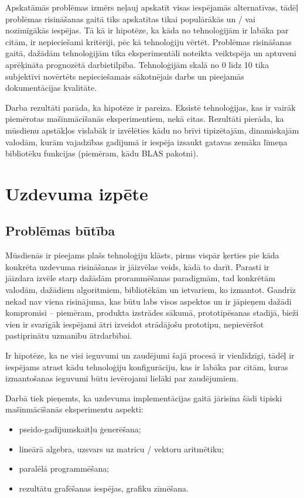 \documentclass{ludis}
\begin{document}
Apskatāmās problēmas izmērs neļauj apskatīt visas iespējamās alternatīvas, tādēļ problēmas risināšanas gaitā tiks apskatītas tikai populārākās un / vai nozīmīgākās iespējas. Tā kā ir hipotēze, ka kāda no tehnoloģijām ir labāka par citām, ir nepieciešami kritēriji, pēc kā tehnoloģiju vērtēt. Problēmas risināšanas gaitā, dažādām tehnoloģijām tika eksperimentāli noteikta veiktspēja un aptuveni aprēķināta prognozētā darbietilpība. Tehnoloģijām skalā no 0 līdz 10 tika subjektīvi novērtēts nepieciešamais sākotnējais darbs un pieejamās dokumentācijas kvalitāte.

Darba rezultāti parāda, ka hipotēze ir pareiza. Eksistē tehnoloģijas, kas ir vairāk piemērotas mašīnmācīšanās eksperimentiem, nekā citas. Rezultāti pierāda, ka mūsdienu apstākļos vislabāk ir izvēlēties kādu no brīvi tipizētajām, dinamiskajām valodām, kurām vajadzības gadījumā ir iespēja izsaukt gatavas zemāka līmeņa bibliotēku funkcijas (piemēram, kādu BLAS pakotni).

\chapter{Uzdevuma izpēte}
\section{Problēmas būtība}
Mūsdienās ir pieejams plašs tehnoloģiju klāsts, pirms vispār ķerties pie kāda konkrēta uzdevuma risināšanas ir jāizvēlas veids, kādā to darīt. Parasti ir jāizdara izvēle starp dažādām prorammēšanas paradigmām, tad konkrētām valodām, dažādiem algoritmiem, bibliotēkām un ietvariem, ko izmantot. Gandrīz nekad nav viena risinājuma, kas būtu labs visos aspektos un ir jāpieņem dažādi kompromisi -- piemēram, produkta izstrādes sākumā, prototipēsanas stadijā, bieži vien ir svarīgāk iespējami ātri izveidot strādājošu prototipu, nepievēršot pastiprinātu uzmanību ātrdarbībai.

Ir hipotēze, ka ne visi ieguvumi un zaudējumi šajā procesā ir vienlīdzīgi, tādēļ ir iespējams atrast kādu tehnoloģiju konfigurāciju, kas ir labāka par citām, kuras izmantošanas ieguvumi būtu ievērojami lielāki par zaudējumiem.

Darbā tiek pieņemts, ka uzdevuma implementācijas gaitā jārisina šādi tipiski mašīnmācīšanās eksperimentu aspekti:
\begin{itemize}
\item pseido-gadījumskaitļu ģenerēšana;
\item lineārā algebra, uzsvars uz matricu / vektoru aritmētiku;
\item paralēlā programmēšana;
\item rezultātu grafēšanas iespējas, grafiku zīmēšana.
\end{itemize}
\end{document}
